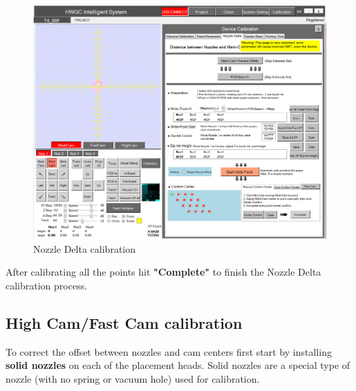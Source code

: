 \documentclass[a4paper,10pt]{report}
\begin{document}
 \begin{figure}[!htb]
 \centering
 \includegraphics[width=1\textwidth]{scrot37.png}
 \caption{Nozzle Delta calibration}
\end{figure}
After calibrating all the points hit \textbf{"Complete"} to finish the Nozzle Delta calibration process.
\newpage
\subsection{High Cam/Fast Cam calibration}
To correct the offset between nozzles and cam centers first start by installing \textbf{solid nozzles} on each of the placement heads. Solid nozzles are a special type of nozzle (with no spring or vacuum hole) used for calibration.\\
\end{document}
